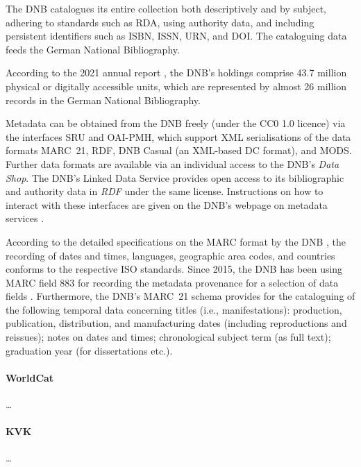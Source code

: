 The DNB catalogues its entire collection both descriptively and by subject, 
adhering to standards such as \gls{RDA}, using authority data, and including persistent identifiers such as ISBN, ISSN, URN, and DOI.
The cataloguing data feeds the German National Bibliography.

According to the 2021 annual report \autocite{DNB_Jahresbericht_2021},
the DNB's holdings comprise 43.7 million physical or digitally accessible units, 
which are represented by almost 26 million records in the German National Bibliography.

Metadata can be obtained from the DNB freely (under the CC0 1.0 licence) via the interfaces
\gls{SRU} and \gls{OAI-PMH}, which support \gls{XML} serialisations of the data formats
\gls{MARC}~21, \gls{RDF}, DNB Casual (an \gls{XML}-based \gls{DC} format), and \gls{MODS}.
Further data formats are available via an individual access
to the DNB's \emph{Data Shop}.
The DNB's Linked Data Service provides open access to its bibliographic and authority data
in \emph{RDF} under the same license. Instructions on how to interact with these interfaces
are given on the DNB's webpage on metadata services \autocite{DNB_metadata}.

According to the detailed specifications on the \gls{MARC} format by the DNB
\autocite{DNB_MARC21,DNB_MARCXML}, the recording of dates and times, languages,
geographic area codes, and countries conforms to the respective \gls{ISO} standards.
Since 2015, the DNB has been using \gls{MARC} field 883
for recording the metadata provenance for a selection of data fields
\autocite{DNBwiki_MARC_883}.
Furthermore, the DNB's MARC~21 schema provides for the cataloguing of the following temporal data concerning
titles (i.e., manifestations): production, publication, distribution, and manufacturing dates
(including reproductions and reissues); notes on dates and times;
chronological subject term (as full text); graduation year (for dissertations etc.).

\paragraph{WorldCat}

\dots

\paragraph{KVK}

\dots

